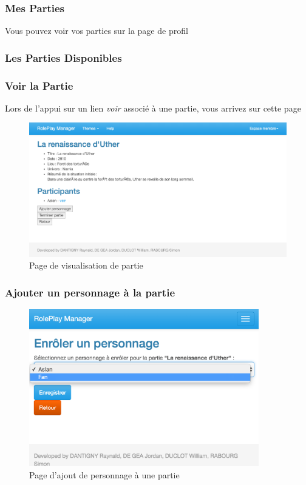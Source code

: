 \documentclass[a4paper,oneside,10pt]{article}
\begin{document}
\subsubsection{Mes Parties}
\label{MUMesParties}

Vous pouvez voir vos parties sur la page de profil

\subsubsection{Les Parties Disponibles}
\label{MULesPartiesDisponibles}

\subsubsection{Voir la Partie}
\label{MUVoirLaPartie}

Lors de l'appui sur un lien \textit{voir} associé à une partie, vous arrivez sur cette page

\begin{figure}[H]
	\begin{center}
		\includegraphics[width=\textwidth]{images/manuel/voirpartie.png}  
		\caption{Page de visualisation de partie}
	\end{center}
\end{figure}

\subsubsection{Ajouter un personnage à la partie}
\label{MUAjouterPersonnagePartie}


\begin{figure}[H]
	\begin{center}
		\includegraphics[width=10cm]{images/manuel/enroll.png}  
		\caption{Page d'ajout de personnage à une partie}
	\end{center}
\end{figure}
\end{document}
